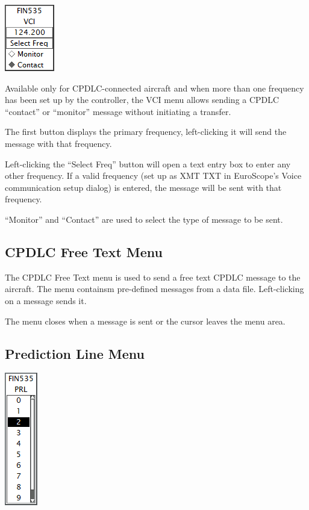 \documentclass[11pt,a4paper]{memoir}
\begin{document}
\includegraphics{img/vci.png}

Available only for CPDLC-connected aircraft and when more than one frequency has been set up by the controller, the VCI menu allows sending a CPDLC “contact” or “monitor” message without initiating a transfer.

The first button displays the primary frequency, left-clicking it will send the message with that frequency.

Left-clicking the “Select Freq” button will open a text entry box to enter any other frequency. If a valid frequency (set up as XMT TXT in EuroScope’s Voice communication setup dialog) is entered, the message will be sent with that frequency.

“Monitor” and “Contact” are used to select the type of message to be sent.

\subsection{CPDLC Free Text Menu}
\label{menu:dlftm}

The CPDLC Free Text menu is used to send a free text CPDLC message to the aircraft. The menu containsm pre-defined messages from a data file. Left-clicking on a message sends it.

The menu closes when a message is sent or the cursor leaves the menu area.

\subsection{Prediction Line Menu}
\label{menu:prl}

\includegraphics{img/prl.png}
\end{document}
